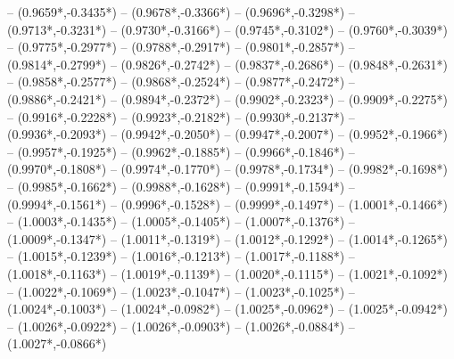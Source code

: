{	-- ({0.9659*\dx},{-0.3435*\dy})
	-- ({0.9678*\dx},{-0.3366*\dy})
	-- ({0.9696*\dx},{-0.3298*\dy})
	-- ({0.9713*\dx},{-0.3231*\dy})
	-- ({0.9730*\dx},{-0.3166*\dy})
	-- ({0.9745*\dx},{-0.3102*\dy})
	-- ({0.9760*\dx},{-0.3039*\dy})
	-- ({0.9775*\dx},{-0.2977*\dy})
	-- ({0.9788*\dx},{-0.2917*\dy})
	-- ({0.9801*\dx},{-0.2857*\dy})
	-- ({0.9814*\dx},{-0.2799*\dy})
	-- ({0.9826*\dx},{-0.2742*\dy})
	-- ({0.9837*\dx},{-0.2686*\dy})
	-- ({0.9848*\dx},{-0.2631*\dy})
	-- ({0.9858*\dx},{-0.2577*\dy})
	-- ({0.9868*\dx},{-0.2524*\dy})
	-- ({0.9877*\dx},{-0.2472*\dy})
	-- ({0.9886*\dx},{-0.2421*\dy})
	-- ({0.9894*\dx},{-0.2372*\dy})
	-- ({0.9902*\dx},{-0.2323*\dy})
	-- ({0.9909*\dx},{-0.2275*\dy})
	-- ({0.9916*\dx},{-0.2228*\dy})
	-- ({0.9923*\dx},{-0.2182*\dy})
	-- ({0.9930*\dx},{-0.2137*\dy})
	-- ({0.9936*\dx},{-0.2093*\dy})
	-- ({0.9942*\dx},{-0.2050*\dy})
	-- ({0.9947*\dx},{-0.2007*\dy})
	-- ({0.9952*\dx},{-0.1966*\dy})
	-- ({0.9957*\dx},{-0.1925*\dy})
	-- ({0.9962*\dx},{-0.1885*\dy})
	-- ({0.9966*\dx},{-0.1846*\dy})
	-- ({0.9970*\dx},{-0.1808*\dy})
	-- ({0.9974*\dx},{-0.1770*\dy})
	-- ({0.9978*\dx},{-0.1734*\dy})
	-- ({0.9982*\dx},{-0.1698*\dy})
	-- ({0.9985*\dx},{-0.1662*\dy})
	-- ({0.9988*\dx},{-0.1628*\dy})
	-- ({0.9991*\dx},{-0.1594*\dy})
	-- ({0.9994*\dx},{-0.1561*\dy})
	-- ({0.9996*\dx},{-0.1528*\dy})
	-- ({0.9999*\dx},{-0.1497*\dy})
	-- ({1.0001*\dx},{-0.1466*\dy})
	-- ({1.0003*\dx},{-0.1435*\dy})
	-- ({1.0005*\dx},{-0.1405*\dy})
	-- ({1.0007*\dx},{-0.1376*\dy})
	-- ({1.0009*\dx},{-0.1347*\dy})
	-- ({1.0011*\dx},{-0.1319*\dy})
	-- ({1.0012*\dx},{-0.1292*\dy})
	-- ({1.0014*\dx},{-0.1265*\dy})
	-- ({1.0015*\dx},{-0.1239*\dy})
	-- ({1.0016*\dx},{-0.1213*\dy})
	-- ({1.0017*\dx},{-0.1188*\dy})
	-- ({1.0018*\dx},{-0.1163*\dy})
	-- ({1.0019*\dx},{-0.1139*\dy})
	-- ({1.0020*\dx},{-0.1115*\dy})
	-- ({1.0021*\dx},{-0.1092*\dy})
	-- ({1.0022*\dx},{-0.1069*\dy})
	-- ({1.0023*\dx},{-0.1047*\dy})
	-- ({1.0023*\dx},{-0.1025*\dy})
	-- ({1.0024*\dx},{-0.1003*\dy})
	-- ({1.0024*\dx},{-0.0982*\dy})
	-- ({1.0025*\dx},{-0.0962*\dy})
	-- ({1.0025*\dx},{-0.0942*\dy})
	-- ({1.0026*\dx},{-0.0922*\dy})
	-- ({1.0026*\dx},{-0.0903*\dy})
	-- ({1.0026*\dx},{-0.0884*\dy})
	-- ({1.0027*\dx},{-0.0866*\dy})
}
